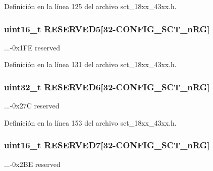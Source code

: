 Definición en la línea 125 del archivo sct\+\_\+18xx\+\_\+43xx.\+h.

\subsubsection[{\texorpdfstring{R\+E\+S\+E\+R\+V\+E\+D5}{RESERVED5}}]{\setlength{\rightskip}{0pt plus 5cm}uint16\+\_\+t R\+E\+S\+E\+R\+V\+E\+D5\mbox{[}32-\/{\bf C\+O\+N\+F\+I\+G\+\_\+\+S\+C\+T\+\_\+n\+RG}\mbox{]}}\hypertarget{struct_l_p_c___s_c_t___t_a63a020f17db842142d6fa33afea05f8b}{}\label{struct_l_p_c___s_c_t___t_a63a020f17db842142d6fa33afea05f8b}
...-\/0x1\+FE reserved 

Definición en la línea 131 del archivo sct\+\_\+18xx\+\_\+43xx.\+h.

\subsubsection[{\texorpdfstring{R\+E\+S\+E\+R\+V\+E\+D6}{RESERVED6}}]{\setlength{\rightskip}{0pt plus 5cm}uint32\+\_\+t R\+E\+S\+E\+R\+V\+E\+D6\mbox{[}32-\/{\bf C\+O\+N\+F\+I\+G\+\_\+\+S\+C\+T\+\_\+n\+RG}\mbox{]}}\hypertarget{struct_l_p_c___s_c_t___t_a9c8a3ab1c41152e3f1630b52dca88f2a}{}\label{struct_l_p_c___s_c_t___t_a9c8a3ab1c41152e3f1630b52dca88f2a}
...-\/0x27C reserved 

Definición en la línea 153 del archivo sct\+\_\+18xx\+\_\+43xx.\+h.

\subsubsection[{\texorpdfstring{R\+E\+S\+E\+R\+V\+E\+D7}{RESERVED7}}]{\setlength{\rightskip}{0pt plus 5cm}uint16\+\_\+t R\+E\+S\+E\+R\+V\+E\+D7\mbox{[}32-\/{\bf C\+O\+N\+F\+I\+G\+\_\+\+S\+C\+T\+\_\+n\+RG}\mbox{]}}\hypertarget{struct_l_p_c___s_c_t___t_a6a6115d67c69f3c355eff2e3f8419874}{}\label{struct_l_p_c___s_c_t___t_a6a6115d67c69f3c355eff2e3f8419874}
...-\/0x2\+BE reserved 

